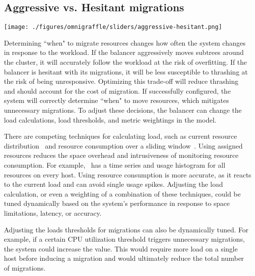 
\subsection{Aggressive vs. Hesitant migrations}
\begin{minipage}{0.8\textwidth}
	\texttt{[image: ./figures/omnigraffle/sliders/aggressive-hesitant.png]} 
	\vspace{0.2in}
\end{minipage}

Determining ``when" to migrate resources changes how often the system changes in response to the workload. If the balancer aggressively moves subtrees around the cluster, it will accurately follow the workload at the risk of overfitting. If the balancer is hesitant with its migrations, it will be less susceptible to thrashing at the risk of being unresponsive. Optimizing this trade-off will reduce thrashing and should account for the cost of migration. If successfully configured, the system will correctly determine ``when" to move resources, which mitigates unnecessary migrations. To adjust these decisions, the balancer can change the load calculations, load thresholds, and metric weightings in the model.

There are competing techniques for calculating load, such as current resource distribution~\cite{vmware-drs,gulati:hotcloud2011-cloud-resource-management} and resource consumption over a sliding window~\cite{xen-wlb,wood:nsdi07-sandpiper}. Using assigned resources reduces the space overhead and intrusiveness of monitoring resource consumption. For example,~\cite{wood:nsdi07-sandpiper} has a time series and usage histogram for all resources on every host. Using resource consumption is more accurate, as it reacts to the current load and can avoid single usage spikes. Adjusting the load calculation, or even a weighting of a combination of these techniques, could be tuned dynamically based on the system's performance in response to space limitations, latency, or accuracy. 

Adjusting the loads thresholds for migrations can also be dynamically tuned. For example, if a certain CPU utilization threshold triggers unnecessary migrations, the system could increase the value. This would require more load on a single host before inducing a migration and would ultimately reduce the total number of migrations.

